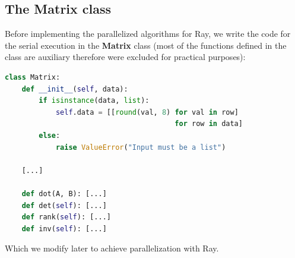 \pagebreak
\subsection{The Matrix class}
Before implementing the parallelized algorithms for Ray, we write the code for the serial execution in the \textbf{Matrix} class (most of the functions defined in the class are auxiliary therefore were excluded for practical purposes):

\begin{lstlisting}[language=Python, label=Matrix class]
class Matrix:
    def __init__(self, data):
        if isinstance(data, list):
            self.data = [[round(val, 8) for val in row]
                                        for row in data]
        else:
            raise ValueError("Input must be a list")
    
    [...]

    def dot(A, B): [...]
    def det(self): [...]
    def rank(self): [...]
    def inv(self): [...]
\end{lstlisting}
Which we modify later to achieve parallelization with Ray.

\pagebreak
